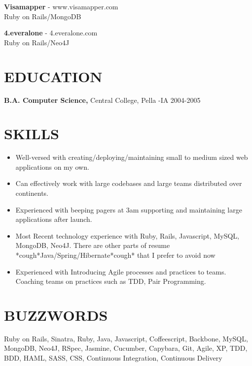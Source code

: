 \documentclass{res}
\begin{document}
\begin{resume}
    {\bf Visamapper} - www.visamapper.com
    \\Ruby on Rails/MongoDB
 
    {\bf 4.everalone} - 4.everalone.com
    \\Ruby on Rails/Neo4J

\section{EDUCATION}
    {\bf B.A. Computer Science,} Central College, Pella -IA
    2004-2005


\section{SKILLS}          
 \begin{itemize} \itemsep -2pt  %
\item Well-versed with creating/deploying/maintaining small to medium sized web applications on my own.
\item Can effectively work with large codebases and large teams distributed over continents.
\item Experienced with beeping pagers at 3am supporting and maintaining large applications after launch.
\item Most Recent technology experience with Ruby, Rails, Javascript, MySQL, MongoDB, Neo4J. There are other parts of resume *cough*Java/Spring/Hibernate*cough* that I prefer to avoid now
\item Experienced with Introducing Agile processes and practices to teams. Coaching teams on practices such as TDD, Pair Programming.

 \end{itemize}


\section{BUZZWORDS}          
Ruby on Rails, Sinatra, Ruby, Java, Javascript, Coffeescript, Backbone, MySQL, MongoDB, Neo4J, RSpec, Jasmine, Cucumber, Capybara, Git, Agile, XP, TDD, BDD, HAML, SASS, CSS, Continuous Integration, Continuous Delivery 
 
\end{resume}
\end{document}
